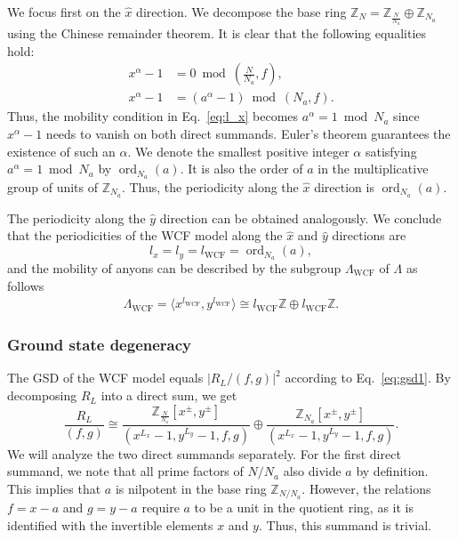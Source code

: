 \documentclass[aps,prb,english,superscriptaddress,twocolumn,tightenlines,showpacs,longbibliography,floatfix,amsfonts]{revtex4-2}
\newcommand{\ord}{\operatorname{ord}}
\begin{document}
We focus first on the $\hat{x}$ direction. We decompose the base ring $\mathbb{Z}_N=\mathbb{Z}_{\frac{N}{N_a}}\oplus\mathbb{Z}_{N_a}$ using the Chinese remainder theorem. It is clear that the following equalities hold:
\begin{subequations}
\begin{align}
        x^{\alpha}-1&=0 \bmod \left(\frac{N}{N_a},f\right),\\
        x^{\alpha}-1&=(a^\alpha-1)\bmod (N_a,f).
\end{align}
\end{subequations}
Thus, the mobility condition in Eq.~\eqref{eq:l_x} becomes $a^{\alpha}=1\bmod N_a$ since $x^{\alpha}-1$ needs to vanish on both direct summands. Euler's theorem guarantees the existence of such an $\alpha$. We denote the smallest positive integer $\alpha$ satisfying $a^{\alpha}=1\bmod N_a$ by $\ord_{N_a}(a)$. It is also the order of $a$ in the multiplicative group of units of $\mathbb{Z}_{N_a}$. Thus, the periodicity along the $\hat{x}$ direction is $\ord_{N_a}\left(a\right)$. 
  
The periodicity along the $\hat{y}$ direction can be obtained analogously. We conclude that the periodicities of the WCF model  along the  $\hat{x}$ and $\hat{y}$ directions are
\begin{equation}
    l_x=l_y=l_{\operatorname{WCF}}=\ord_{N_a}(a),
\end{equation}
and the mobility of anyons can be described by the subgroup $\Lambda_{{\operatorname{WCF}}}$ of $\Lambda$ as follows
\begin{align}
  \Lambda_{{\operatorname{WCF}}}=\langle x^{l_{\operatorname{WCF}}},y^{l_{\operatorname{WCF}}}\rangle\cong l_{\operatorname{WCF}}\mathbb{Z}\oplus l_{\operatorname{WCF}}\mathbb{Z}.\label{eq:pgb}
\end{align}
  
\subsubsection{Ground state degeneracy}

The GSD of the WCF model equals $|R_L/(f,g)|^2$ according to Eq.~\eqref{eq:gsd1}. By decomposing $R_L$ into a direct sum, we get
\begin{equation}
    \frac{R_L}{(f,g)}\cong\frac{{\mathbb{Z}_{\frac{N}{N_a}}[x^{\pm},y^{\pm}]}}{(x^{L_x}-1,y^{L_y}-1,f,g)}\oplus\frac{{\mathbb{Z}_{N_a}[x^{\pm},y^{\pm}]}}{(x^{L_x}-1,y^{L_y}-1,f,g)}.\label{eq:tc_decom}
\end{equation}
We will analyze the two direct summands separately. For the first direct summand, we note that all prime factors of $N/N_a$ also divide $a$ by definition. This implies that $a$ is nilpotent in the base ring $\mathbb{Z}_{{N}/{N_a}}$. However, the relations $f=x-a$ and $g=y-a$ require $a$ to be a unit in the quotient ring, as it is identified with the invertible elements $x$ and $y$. Thus, this summand is trivial.
\end{document}
